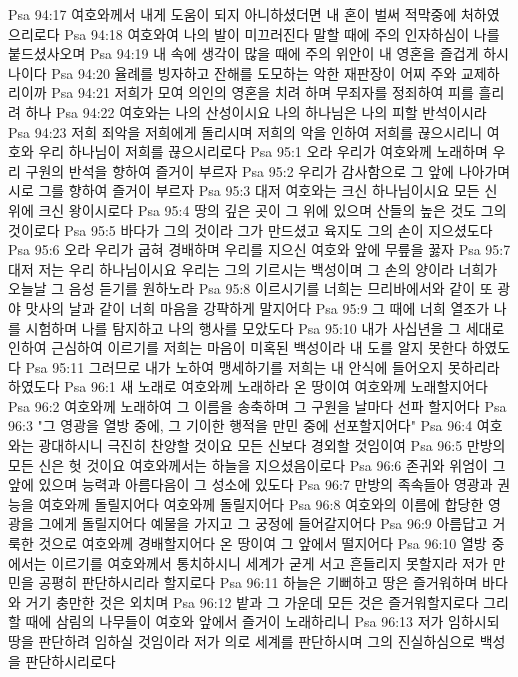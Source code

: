 Psa 94:17  여호와께서 내게 도움이 되지 아니하셨더면 내 혼이 벌써 적막중에 처하였으리로다
Psa 94:18  여호와여 나의 발이 미끄러진다 말할 때에 주의 인자하심이 나를 붙드셨사오며
Psa 94:19  내 속에 생각이 많을 때에 주의 위안이 내 영혼을 즐겁게 하시나이다
Psa 94:20  율례를 빙자하고 잔해를 도모하는 악한 재판장이 어찌 주와 교제하리이까
Psa 94:21  저희가 모여 의인의 영혼을 치려 하며 무죄자를 정죄하여 피를 흘리려 하나
Psa 94:22  여호와는 나의 산성이시요 나의 하나님은 나의 피할 반석이시라
Psa 94:23  저희 죄악을 저희에게 돌리시며 저희의 악을 인하여 저희를 끊으시리니 여호와 우리 하나님이 저희를 끊으시리로다
Psa 95:1  오라 우리가 여호와께 노래하며 우리 구원의 반석을 향하여 즐거이 부르자
Psa 95:2  우리가 감사함으로 그 앞에 나아가며 시로 그를 향하여 즐거이 부르자
Psa 95:3  대저 여호와는 크신 하나님이시요 모든 신 위에 크신 왕이시로다
Psa 95:4  땅의 깊은 곳이 그 위에 있으며 산들의 높은 것도 그의 것이로다
Psa 95:5  바다가 그의 것이라 그가 만드셨고 육지도 그의 손이 지으셨도다
Psa 95:6  오라 우리가 굽혀 경배하며 우리를 지으신 여호와 앞에 무릎을 꿇자
Psa 95:7  대저 저는 우리 하나님이시요 우리는 그의 기르시는 백성이며 그 손의 양이라 너희가 오늘날 그 음성 듣기를 원하노라
Psa 95:8  이르시기를 너희는 므리바에서와 같이 또 광야 맛사의 날과 같이 너희 마음을 강퍅하게 말지어다
Psa 95:9  그 때에 너희 열조가 나를 시험하며 나를 탐지하고 나의 행사를 모았도다
Psa 95:10  내가 사십년을 그 세대로 인하여 근심하여 이르기를 저희는 마음이 미혹된 백성이라 내 도를 알지 못한다 하였도다
Psa 95:11  그러므로 내가 노하여 맹세하기를 저희는 내 안식에 들어오지 못하리라 하였도다
Psa 96:1  새 노래로 여호와께 노래하라 온 땅이여 여호와께 노래할지어다
Psa 96:2  여호와께 노래하여 그 이름을 송축하며 그 구원을 날마다 선파 할지어다
Psa 96:3  "그 영광을 열방 중에, 그 기이한 행적을 만민 중에 선포할지어다"
Psa 96:4  여호와는 광대하시니 극진히 찬양할 것이요 모든 신보다 경외할 것임이여
Psa 96:5  만방의 모든 신은 헛 것이요 여호와께서는 하늘을 지으셨음이로다
Psa 96:6  존귀와 위엄이 그 앞에 있으며 능력과 아름다음이 그 성소에 있도다
Psa 96:7  만방의 족속들아 영광과 권능을 여호와께 돌릴지어다 여호와께 돌릴지어다
Psa 96:8  여호와의 이름에 합당한 영광을 그에게 돌릴지어다 예물을 가지고 그 궁정에 들어갈지어다
Psa 96:9  아름답고 거룩한 것으로 여호와께 경배할지어다 온 땅이여 그 앞에서 떨지어다
Psa 96:10  열방 중에서는 이르기를 여호와께서 통치하시니 세계가 굳게 서고 흔들리지 못할지라 저가 만민을 공평히 판단하시리라 할지로다
Psa 96:11  하늘은 기뻐하고 땅은 즐거워하며 바다와 거기 충만한 것은 외치며
Psa 96:12  밭과 그 가운데 모든 것은 즐거워할지로다 그리할 때에 삼림의 나무들이 여호와 앞에서 즐거이 노래하리니
Psa 96:13  저가 임하시되 땅을 판단하려 임하실 것임이라 저가 의로 세계를 판단하시며 그의 진실하심으로 백성을 판단하시리로다
